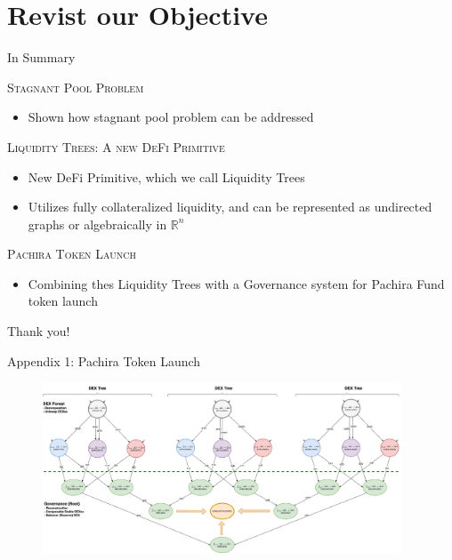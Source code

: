\documentclass[10pt,xcolor=svgnames]{beamer} %
\begin{document}
\section{Revist our Objective}

\begin{frame}{In Summary}


\begin{exampleblock}{\textsc{Stagnant Pool Problem}}
\begin{itemize}
  \item Shown how stagnant pool problem can be addressed
\end{itemize}
\end{exampleblock}

\begin{exampleblock}{\textsc{Liquidity Trees: A new DeFi Primitive}}
\begin{itemize}
  \item New DeFi Primitive, which we call Liquidity Trees 
  \item Utilizes fully collateralized liquidity, and can be represented as undirected graphs or algebraically in $\mathbb{R}^n$
\end{itemize}
\end{exampleblock}

\begin{exampleblock}{\textsc{Pachira Token Launch}}
\begin{itemize}
  \item Combining thes Liquidity Trees with a Governance system for Pachira Fund token launch
\end{itemize}
\end{exampleblock}



\end{frame}


\begin{frame}[standout]
  Thank you! 
\end{frame}

\begin{frame}{Appendix 1: Pachira Token Launch}
\begin{figure}[h!]
\includegraphics[width=4.2in]{img/dex_forest.png}
\label{fig:dex_forest}
\end{figure}
\end{frame}
\end{document}
